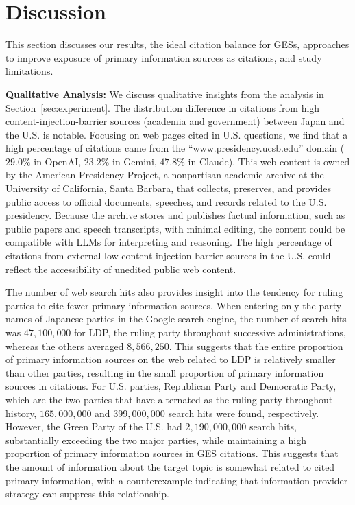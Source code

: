 \section{Discussion}
\label{sec:discussion}
This section discusses our results, the ideal citation balance for GESs, approaches to improve exposure of primary information sources as citations, and study limitations.

\textbf{Qualitative Analysis:}
We discuss qualitative insights from the analysis in Section~\ref{sec:experiment}.
The distribution difference in citations from high content-injection-barrier sources (academia and government) between Japan and the U.S. is notable.
Focusing on web pages cited in U.S. questions, we find that a high percentage of citations came from the ``www.presidency.ucsb.edu'' domain (\(29.0\%\) in OpenAI, \(23.2\%\) in Gemini, \(47.8\%\) in Claude).
This web content is owned by the American Presidency Project, a nonpartisan academic archive at the University of California, Santa Barbara, that collects, preserves, and provides public access to official documents, speeches, and records related to the U.S. presidency.
Because the archive stores and publishes factual information, such as public papers and speech transcripts, with minimal editing, the content could be compatible with LLMs for interpreting and reasoning.
The high percentage of citations from external low content-injection barrier sources in the U.S. could reflect the accessibility of unedited public web content.

The number of web search hits also provides insight into the tendency for ruling parties to cite fewer primary information sources.
When entering only the party names of Japanese parties in the Google search engine, the number of search hits was \(47{,}100{,}000\) for LDP, the ruling party throughout successive administrations, whereas the others averaged \(8{,}566{,}250\).
This suggests that the entire proportion of primary information sources on the web related to LDP is relatively smaller than other parties, resulting in the small proportion of primary information sources in citations.
For U.S. parties, Republican Party and Democratic Party, which are the two parties that have alternated as the ruling party throughout history, \(165{,}000{,}000\) and \(399{,}000{,}000\) search hits were found, respectively.
However, the Green Party of the U.S. had \(2{,}190{,}000{,}000\) search hits, substantially exceeding the two major parties, while maintaining a high proportion of primary information sources in GES citations.
This suggests that the amount of information about the target topic is somewhat related to cited primary information, with a counterexample indicating that information-provider strategy can suppress this relationship.

